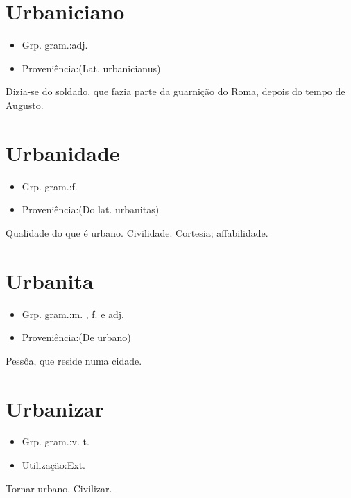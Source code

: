 \documentclass{article}
\begin{document}
\section{Urbaniciano}
\begin{itemize}
\item {Grp. gram.:adj.}
\end{itemize}
\begin{itemize}
\item {Proveniência:(Lat. \textunderscore urbanicianus\textunderscore )}
\end{itemize}
Dizia-se do soldado, que fazia parte da guarnição do Roma, depois do tempo de Augusto.
\section{Urbanidade}
\begin{itemize}
\item {Grp. gram.:f.}
\end{itemize}
\begin{itemize}
\item {Proveniência:(Do lat. \textunderscore urbanitas\textunderscore )}
\end{itemize}
Qualidade do que é urbano.
Civilidade.
Cortesia; affabilidade.
\section{Urbanita}
\begin{itemize}
\item {Grp. gram.:m. ,  f.  e  adj.}
\end{itemize}
\begin{itemize}
\item {Proveniência:(De \textunderscore urbano\textunderscore )}
\end{itemize}
Pessôa, que reside numa cidade.
\section{Urbanizar}
\begin{itemize}
\item {Grp. gram.:v. t.}
\end{itemize}
\begin{itemize}
\item {Utilização:Ext.}
\end{itemize}
Tornar urbano.
Civilizar.
\end{document}

